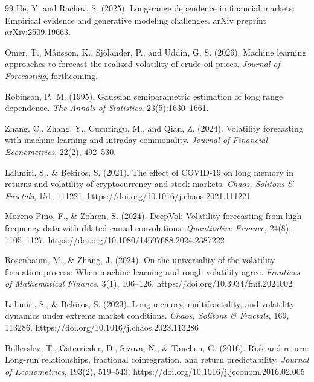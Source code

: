 \documentclass[12pt,a4paper]{article}
\begin{document}
\begin{thebibliography}{99}
He, Y. and Rachev, S. (2025).
\newblock Long-range dependence in financial markets: Empirical evidence and generative modeling challenges.
\newblock arXiv preprint arXiv:2509.19663.

Omer, T., M{\aa}nsson, K., Sj{\"o}lander, P., and Uddin, G. S. (2026).
\newblock Machine learning approaches to forecast the realized volatility of crude oil prices.
\newblock \textit{Journal of Forecasting}, forthcoming.

Robinson, P.~M. (1995).
\newblock Gaussian semiparametric estimation of long range dependence.
\newblock \textit{The Annals of Statistics}, 23(5):1630--1661.

Zhang, C., Zhang, Y., Cucuringu, M., and Qian, Z. (2024).
\newblock Volatility forecasting with machine learning and intraday commonality.
\newblock \textit{Journal of Financial Econometrics}, 22(2), 492--530.

Lahmiri, S., \& Bekiros, S. (2021).
The effect of COVID-19 on long memory in returns and volatility of cryptocurrency and stock markets.
\emph{Chaos, Solitons \& Fractals}, 151, 111221.
https://doi.org/10.1016/j.chaos.2021.111221

Moreno-Pino, F., \& Zohren, S. (2024).
DeepVol: Volatility forecasting from high-frequency data with dilated causal convolutions.
\emph{Quantitative Finance}, 24(8), 1105--1127.
https://doi.org/10.1080/14697688.2024.2387222

Rosenbaum, M., \& Zhang, J. (2024).
On the universality of the volatility formation process: When machine learning and rough volatility agree.
\emph{Frontiers of Mathematical Finance}, 3(1), 106--126.
https://doi.org/10.3934/fmf.2024002

Lahmiri, S., \& Bekiros, S. (2023).
Long memory, multifractality, and volatility dynamics under extreme market conditions.
\emph{Chaos, Solitons \& Fractals}, 169, 113286.
https://doi.org/10.1016/j.chaos.2023.113286

Bollerslev, T., Osterrieder, D., Sizova, N., \& Tauchen, G. (2016).
Risk and return: Long-run relationships, fractional cointegration, and return predictability.
\emph{Journal of Econometrics}, 193(2), 519--543.
https://doi.org/10.1016/j.jeconom.2016.02.005

\end{thebibliography}
\end{document}

